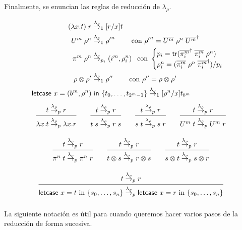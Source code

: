 Finalmente, se enuncian las reglas de reducción de $\lambda_\rho$.
\begin{figure}[H]
\begin{definicion}
\label{def:reduccion_lambda1}
\begin{align*}
(\lambda x.t)\;r &\overset{\lambda_\rho}{\rightarrow}_1 [r/x]t\\
U^m\;\rho^n &\overset{\lambda_\rho}{\rightarrow}_1 {\rho'}^n \qquad \text{ con } {\rho'}^n = \overline{U^m}\;\rho^n\;\overline{U^m}^\dagger \\
\pi^m\;\rho^n &\overset{\lambda_\rho}{\rightarrow}_{p_i} (i^m, \rho_i^n) \;\, \text{ con }
\begin{cases}
p_i = \mathsf{tr}(\overline{\pi^m_i}^\dagger\;\overline{\pi^m_i}\;\rho^n)\\
\rho^n_i = (\overline{\pi^m_i}\;\rho^n\;\overline{\pi^m_i}^\dagger)/p_i
\end{cases}\\
\rho \otimes \rho' &\overset{\lambda_\rho}{\rightarrow}_1 \rho'' \qquad \text{ con } \rho'' = \rho \otimes \rho' \\
\textsf{letcase } x = (b^m, \rho^n) &\textsf{ in } \{t_0, \dots, t_{2^m-1}\} \overset{\lambda_\rho}{\rightarrow}_1 [\rho^n/x] t_{b^m}
\end{align*}
 \[\arraycolsep=10pt\def\arraystretch{2.6}
   \begin{array}{cccc}
     \infer
     {\lambda x.t \redlam_p \lambda x.r}
     {t \redlam_p r}
     &
         \infer
         {t\;s\redlam_p r\;s}
         {t \redlam_p r}
     &
         \infer
         {s\;t\redlam_p s\;r}
         {t \redlam_p r}
     &
         \infer
         {U^m\;t\redlam_p U^m\;r}
         {t \redlam_p r}
   \end{array}
 \]
 \[\arraycolsep=10pt\def\arraystretch{2.6}
   \begin{array}{cccc}
     \infer
     {\pi^n\;t \redlam_p \pi^n\;r}
     {t \redlam_p r}
     &
         \infer
         {t\otimes s \redlam_p r \otimes s}
         {t \redlam_p r}
     &
         \infer
         {s\otimes t \redlam_p s \otimes r}
         {t \redlam_p r}
   \end{array} 
 \]
 \[\arraycolsep=10pt\def\arraystretch{2.6}
   \begin{array}{c}
     \infer
     {\textsf{letcase }x = t \textrm{ in } \{s_0,\dots,s_n\} \redlam_p \textsf{letcase }x = r \textrm{ in } \{s_0,\dots,s_n\} }
     {t \redlam_p r}
   \end{array}
 \]
\end{definicion}
\end{figure}

La siguiente notación es útil para cuando queremos hacer varios pasos de la reducción de forma sucesiva.

